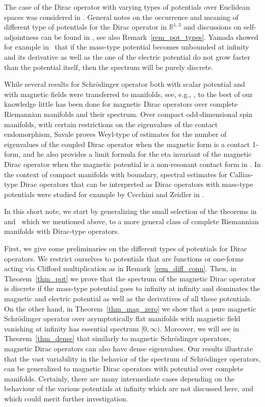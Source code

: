\documentclass[10pt,a4paper]{amsart}
\numberwithin{equation}{section}
\begin{document}
The case of the Dirac operator with varying types of potentials over Euclidean spaces was considered in \cite{HNW, Yamada}. General notes on the occurrence and meaning of different type of potentials for the Dirac operator in ${\mathbb R}^{1,3}$ and discussions on self-adjointness can be found in \cite[Sections~4.2 and~4.3]{Thaller}, see also Remark~\ref{rem_pot_types}. Yamada showed for example in~\cite{Yamada} that if the mass-type potential becomes unbounded at infinity and its derivative as well as the one of the electric potential do not grow faster than the potential itself, then the spectrum will be purely discrete.

While several results for Schr\"odinger operator both with scalar potential and with magnetic fields were transferred to manifolds, see, e.g., \cite{shi2, Shubin}, to the best of our knowledge little has been done for magnetic Dirac operators over complete Riemannian manifolds and their spectrum. Over compact odd-dimensional spin manifolds, with certain restrictions on the eigenvalues of the contact endomorphism, Savale proves Weyl-type of estimates for the number of eigenvalues of the coupled Dirac operator when the magnetic form is a contact 1-form, and he also provides a limit formula for the eta invariant of the magnetic Dirac operator when the magnetic potential is a non-resonant contact form in \cite{sav, sav2}. In the context of compact manifolds with boundary, spectral estimates for Callias-type Dirac operators that can be interpreted as Dirac operators with mass-type potentials were studied for example by Cecchini and Zeidler in \cite{CZ}.

In this short note, we start by generalizing the small selection of the theorems in~\cite{CFKS} and~\cite{Yamada} which we mentioned above, to a more general class of complete Riemannian manifolds with Dirac-type operators.

First, we give some preliminaries on the different types of potentials for Dirac operators. We restrict ourselves to potentials that are functions or one-forms acting via Clifford multiplication as in Remark~\ref{rem_diff_conn}. Then, in Theorem~\ref{thm_pot} we prove that the spectrum of the magnetic Dirac operator is discrete if the mass-type potential goes to infinity at infinity and dominates the magnetic and electric potential as well as the derivatives of all these potentials. On the other hand, in Theorem~\ref{thm_mag_zero} we show that a pure magnetic Schr\"odinger operator over asymptotically flat manifolds with magnetic field vanishing at infinity has essential spectrum $[0,\infty)$. Moreover, we will see in Theorem~\ref{thm_dense} that similarly to magnetic Schr\"odinger operators, magnetic Dirac operators can also have dense eigenvalues. Our results illustrate that the vast variability in the behavior of the spectrum of Schr\"odinger operators, can be generalized to magnetic Dirac operators with potential over complete manifolds. Certainly, there are many intermediate cases depending on the behaviour of the various potentials at infinity which are not discussed here, and which could merit further investigation.
\end{document}
